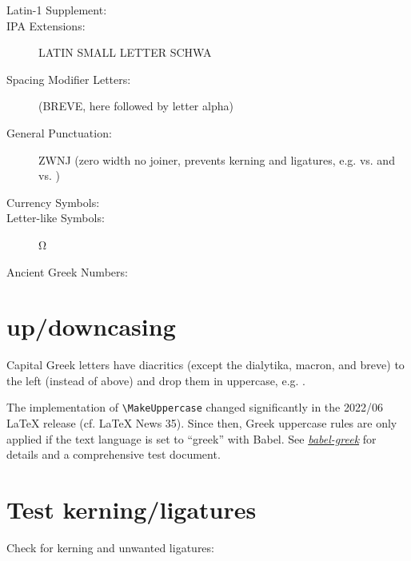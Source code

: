 \documentclass[a4paper]{article}
\begin{document}
\begin{description}

\item [Latin-1 Supplement:] 
\item [IPA Extensions:]  LATIN SMALL LETTER SCHWA
\item [Spacing Modifier Letters:]
       (BREVE, here followed by letter alpha)
\item [General Punctuation:]
       ZWNJ (zero width no joiner, prevents kerning
      and ligatures, e.g.  vs.  and
       vs. )
\item [Currency Symbols:] 
\item [Letter-like Symbols:] Ω  %
\item [Ancient Greek Numbers:] 
\end{description}


\section{up/downcasing}

Capital Greek letters have diacritics (except the dialytika, macron, and
breve) to the left (instead of above) and drop them in uppercase, e.g.
.

The implementation of \verb|\MakeUppercase| changed significantly in the
2022/06 LaTeX release (cf. LaTeX News 35). Since then, Greek uppercase rules
are only applied if the text language is set to ``greek'' with Babel.
See \href{https://ctan.org/pkg/babel-greek}{\emph{babel-greek}} for details
and a comprehensive test document.


\section{Test kerning/ligatures}


Check for kerning and unwanted ligatures:
\end{document}
